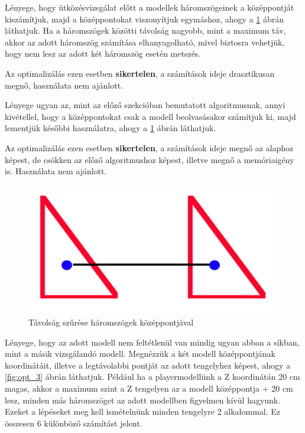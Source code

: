 \newpage
{}
Lényege, hogy ütközésvizsgálat előtt a modellek háromszögeinek a középpontját kiszámítjuk, majd a középpontokat viszonyítjuk egymáshoz, ahogy a \ref{fig:opt_2} ábrán láthatjuk. Ha a háromszögek közötti távolság nagyobb, mint a maximum táv, akkor az adott háromszög számítása elhanyagolható, mivel biztosra vehetjük, hogy nem lesz az adott két háromszög esetén metszés.

Az optimalizálás ezen esetben \textbf{sikertelen}, a számítások ideje drasztikusan megnő, használata nem ajánlott.

Lényege ugyan az, mint az előző szekcióban bemutatott algoritmusnak, annyi kivétellel, hogy a középpontokat csak a modell beolvasásakor számítjuk ki, majd lementjük későbbi használatra, ahogy a \ref{fig:opt_2} ábrán láthatjuk.

Az optimalizálás ezen esetben \textbf{sikertelen}, a számítások ideje megnő az alaphoz képest, de csökken az előző algoritmushoz képest, illetve megnő a memóriaigény is. Használata nem ajánlott.
\begin{figure}[h]
	\centering
	\includegraphics[width=13truecm, height=7.5truecm]{images/opt_5.2.png}
	\caption{Távolság szűrése háromszögek középpontjával}
	\label{fig:opt_2}
\end{figure}

\newpage
{}
Lényege, hogy az adott modell nem feltétlenül van mindig ugyan abban a síkban, mint a másik vizsgálandó modell. Megnézzük a két modell középpontjának koordinátáit, illetve a legtávolabbi pontját az adott tengelyhez képest, ahogy a \ref{fig:opt_3} ábrán láthatjuk. Például ha a playermodellünk a Z koordinátán 20 cm magas, akkor a maximum szint a Z tengelyen az a modell középpontja + 20 cm lesz, minden más háromszöget az adott modellben figyelmen kívül hagyunk. Ezeket a lépéseket meg kell ismételnünk minden tengelyre 2 alkalommal. Ez összesen 6 különböző számítást jelent.


